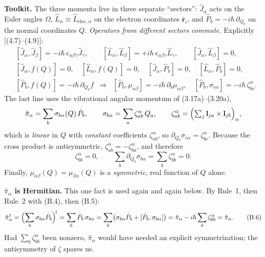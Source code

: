 \textbf{Toolkit.} The three momenta live in three separate ``sectors'': $\hat J_\alpha$ acts on the Euler angles $\Omega$, $\hat L_\alpha\equiv\hat L_{\mathrm{elec},\alpha}$ on the electron coordinates $\bar{\mathbf r}_i$, and $\hat P_b=-i\hbar\,\partial_{Q_b}$ on the normal coordinates $Q$. \emph{Operators from different sectors commute.} Explicitly [(4.7)--(4.9)]:
\begin{align}
&[\hat J_\alpha,\hat J_\beta]=-i\hbar\,\epsilon_{\alpha\beta\gamma}\hat J_\gamma,\qquad
[\hat L_\alpha,\hat L_\beta]=+i\hbar\,\epsilon_{\alpha\beta\gamma}\hat L_\gamma,\qquad
[\hat J_\alpha,\hat L_\beta]=0, \tag{B.2}\\[2pt]
&[\hat J_\alpha,f(Q)]=0,\quad [\hat L_\alpha,f(Q)]=0,\quad [\hat J_\alpha,\hat P_b]=0,\quad [\hat L_\alpha,\hat P_b]=0, \tag{B.3}\\[2pt]
&[\hat P_b,f(Q)]=-i\hbar\,\partial_{Q_b}f
\;\;\Longrightarrow\;\;
[\hat P_b,\mu_{\alpha\beta}]=-i\hbar\,\partial_b\mu_{\alpha\beta},\quad
[\hat P_b,\sigma_{c\alpha}]=-i\hbar\,\zeta^{\alpha}_{bc}. \tag{B.4}
\end{align}
The last line uses the vibrational angular momentum of (3.17a)--(3.20a),
\begin{equation*}
\hat\pi_\alpha=\sum_b\sigma_{b\alpha}(Q)\,\hat P_b,\qquad
\sigma_{b\alpha}=\sum_a\zeta^{\alpha}_{ab}\,Q_a,\qquad
\zeta^{\alpha}_{ab}=\Bigl(\textstyle\sum_j\mathbf l_{ja}\times\mathbf l_{jb}\Bigr)_\alpha ,
\end{equation*}
which is \emph{linear} in $Q$ with \emph{constant} coefficients $\zeta^{\alpha}_{ab}$, so $\partial_{Q_b}\sigma_{c\alpha}=\zeta^{\alpha}_{bc}$. Because the cross product is antisymmetric, $\zeta^{\alpha}_{ab}=-\zeta^{\alpha}_{ba}$, and therefore
\begin{equation}
\zeta^{\alpha}_{bb}=0,\qquad \sum_b\partial_{Q_b}\sigma_{b\alpha}=\sum_b\zeta^{\alpha}_{bb}=0 . \tag{B.5}
\end{equation}
Finally, $\mu_{\alpha\beta}(Q)=\mu_{\beta\alpha}(Q)$ is a \emph{symmetric}, real function of $Q$ alone.

\textbf{$\hat\pi_\alpha$ is Hermitian.} This one fact is used again and again below. By Rule~1, then Rule~2 with (B.4), then (B.5):
\begin{equation}
\hat\pi_\alpha^{\dagger}=\Bigl(\sum_b\sigma_{b\alpha}\hat P_b\Bigr)^{\!\dagger}
=\sum_b\hat P_b\,\sigma_{b\alpha}
=\sum_b\bigl(\sigma_{b\alpha}\hat P_b+[\hat P_b,\sigma_{b\alpha}]\bigr)
=\hat\pi_\alpha-i\hbar\sum_b\zeta^{\alpha}_{bb}
=\hat\pi_\alpha . \tag{B.6}
\end{equation}
Had $\sum_b\zeta^{\alpha}_{bb}$ been nonzero, $\hat\pi_\alpha$ would have needed an explicit symmetrization; the antisymmetry of $\zeta$ spares us.

